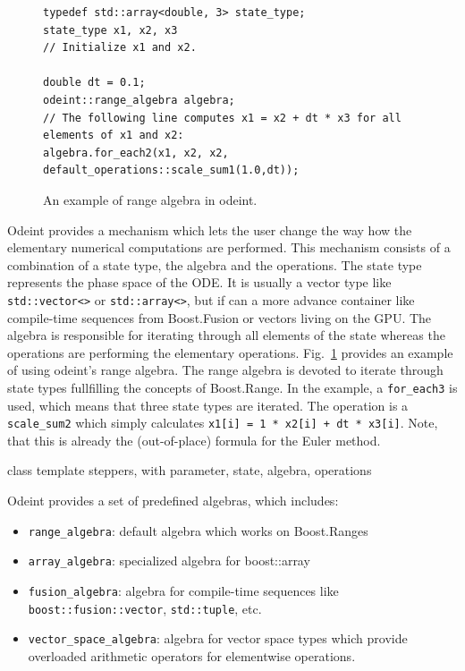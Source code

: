 \documentclass[1p]{elsarticle}
\newcommand{\code}[1]{\lstinline|#1|}
\newcommand{\figref}[1]{Fig.~\ref{#1}}
\begin{document}
\begin{figure}
\begin{lstlisting}
typedef std::array<double, 3> state_type;
state_type x1, x2, x3
// Initialize x1 and x2.

double dt = 0.1;
odeint::range_algebra algebra;
// The following line computes x1 = x2 + dt * x3 for all elements of x1 and x2:
algebra.for_each2(x1, x2, x2, default_operations::scale_sum1(1.0,dt));
\end{lstlisting}
\caption{An example of range algebra in odeint.}
\label{fig:odeintops}
\end{figure}

Odeint provides a mechanism which lets the user change the way how the
elementary numerical computations are performed. This mechanism consists of a
combination of a state type, the algebra and the operations. The state type represents the
phase space of the ODE. It is usually a vector type like
\code{std::vector<>} or \code{std::array<>}, but if can a more advance container like compile-time sequences from Boost.Fusion or vectors living on the GPU. The algebra is responsible for
iterating through all elements of the state whereas the operations are
performing the elementary operations. \figref{fig:odeintops} provides an
example of using odeint's range algebra. The range algebra is devoted to iterate through state types fullfilling the concepts of Boost.Range. In the example, a \code{for_each3} is used, which means that
three state types are iterated. The operation is a \code{scale_sum2} which simply
calculates \code{x1[i] = 1 * x2[i] + dt * x3[i]}. Note, that this is already the (out-of-place) formula for the Euler method.

class template steppers, with parameter, state, algebra, operations


Odeint provides a set of predefined algebras, which includes:
\begin{itemize}
    \item \code{range_algebra}: default algebra which works on Boost.Ranges
    \item \code{array_algebra}: specialized algebra for boost::array
    \item \code{fusion_algebra}: algebra for compile-time sequences like
	\code{boost::fusion::vector}, \code{std::tuple}, etc.
    \item \code{vector_space_algebra}: algebra for vector space types which
	provide overloaded arithmetic operators for elementwise operations.
\end{itemize}
\end{document}
